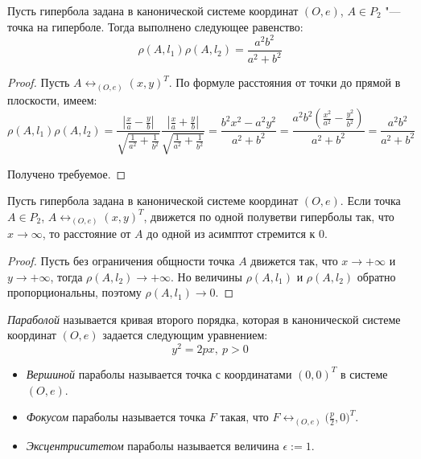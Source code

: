 {\begin{proposition}
	Пусть гипербола задана в канонической системе координат $(O, e)$, $A \in P_2$ "--- точка на гиперболе. Тогда выполнено следующее равенство:
	\[\rho(A, l_1)\rho(A, l_2) = \frac{a^2b^2}{a^2 + b^2}\]
\end{proposition}

\begin{proof}
	Пусть $A \leftrightarrow_{(O, e)} (x, y)^T$. По формуле расстояния от точки до прямой в плоскости, имеем:
	\[\rho(A, l_1)\rho(A, l_2) = \frac{\left|\frac{x}{a}-\frac{y}{b}\right|}{\sqrt{\frac{1}{a^2} + \frac{1}{b^2}}} 
	\frac{\left|\frac{x}{a}+\frac{y}{b}\right|}{\sqrt{\frac{1}{a^2} + \frac{1}{b^2}}}
	= \frac{b^2x^2 - a^2y^2}{a^2 + b^2} = \frac{a^2b^2\left(\frac{x^2}{a^2} - \frac{y^2}{b^2}\right)}{a^2 + b^2} = \frac{a^2b^2}{a^2 + b^2}\]
	
	Получено требуемое.
\end{proof}

\begin{corollary}
	Пусть гипербола задана в канонической системе координат $(O, e)$. Если точка $A \in P_2$, $A \leftrightarrow_{(O, e)} (x, y)^T$, движется по одной полуветви гиперболы так, что $x \rightarrow \infty$, то расстояние от $A$ до одной из асимптот стремится к $0$.
\end{corollary}

\begin{proof}
	Пусть без ограничения общности точка $A$ движется так, что $x \rightarrow +\infty$ и $y \rightarrow +\infty$, тогда $\rho(A, l_2) \rightarrow +\infty$. Но величины $\rho(A, l_1)$ и $\rho(A, l_2)$ обратно пропорциональны, поэтому $\rho(A, l_1) \rightarrow 0$.
\end{proof}

\begin{definition}
	\textit{Параболой} называется кривая второго порядка, которая в канонической системе координат $(O, e)$ задается следующим уравнением:
	\[y^2 = 2px,~p > 0\]
	
	\begin{itemize}
		\item \textit{Вершиной} параболы называется точка с координатами $(0, 0)^T$ в системе $(O, e)$.
		
		\item \textit{Фокусом} параболы называется точка $F$ такая, что $F \leftrightarrow_{(O, e)} \big(\frac p2, 0\big)^T$.
		
		\item \textit{Эксцентриситетом} параболы называется величина $\epsilon := 1$.
		

\end{itemize}
\end{definition}}

